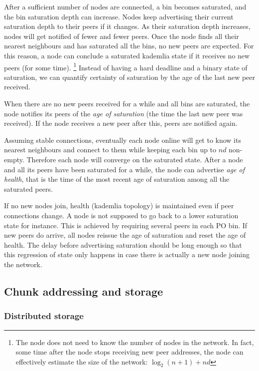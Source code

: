 \documentclass[a4paper,10pt,fullpage]{article}
\numberwithin{equation}{section}
\newcommand\gloss[1]{\emph{\gls{#1}}}
\theoremstyle{definition}
\begin{document}
After a sufficient number of nodes are connected, a bin becomes saturated, and the bin saturation depth can increase.
Nodes keep advertising their current saturation depth to their peers if it changes. 
As their saturation depth increases, nodes will get notified of fewer and fewer peers. Once the node finds all their nearest neighbours and has saturated all the bins, no new peers are expected. For this reason, a node can conclude  a saturated kademlia state if it receives no new peers (for some time).%
%
\footnote{The node does not need to know the number of nodes in the network. In fact, some time after the node stops receiving new peer addresses, the node can effectively estimate the size of the network: $\log_2(n+1)+ nd$}
%
Instead of having a hard deadline and a binary state of
saturation, we can quantify certainty of saturation by the age of the last new peer received.

When there are no new peers received for a while and all bins are saturated, the node notifies its peers of the \gloss{age of saturation} (the time the last new peer was received). If the node receives a new peer after this, peers are notified again.

Assuming stable connections, eventually each node online will get to know its nearest neighbours and connect to them while keeping each bin up to $nd$ non-empty. Therefore each node will converge on the saturated state. 
After a node and all its peers have been saturated for a while, the node can advertise \gloss{age of health}, 
that is the time of the most recent age of saturation among all the saturated peers. 

If no new nodes join, health (kademlia topology) is maintained even if peer connections change. A node is not supposed to go back to a lower saturation state for instance. This is achieved by requiring several peers in each PO bin. 
If new peers do arrive, all nodes reissue the age of saturation and reset the age of health. The delay before advertising saturation should be long enough so that this regression of state only happens in case there is actually a new node joining the network.


\subsection{Chunk addressing and storage}

\subsubsection{Distributed storage}
 
\end{document}
